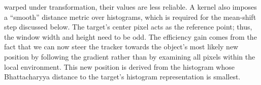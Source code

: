 \documentclass[a4paper,11pt]{article}
\begin{document}
		warped under transformation, their values are less reliable. A kernel
		also imposes a ``smooth'' distance metric over histograms, which is
		required for the mean-shift step discussed below. The target's center
		pixel acts as the reference point; thus, the window width and height
		need to be odd. The efficiency gain comes from the fact that we can
		now steer the tracker towards the object's most likely new position
		by following the gradient rather than by examining all pixels within
		the local environment. This new position is derived from the histogram
		whose Bhattacharyya distance to the target's histogram representation
		is smallest.
		\\ \\
\end{document}

